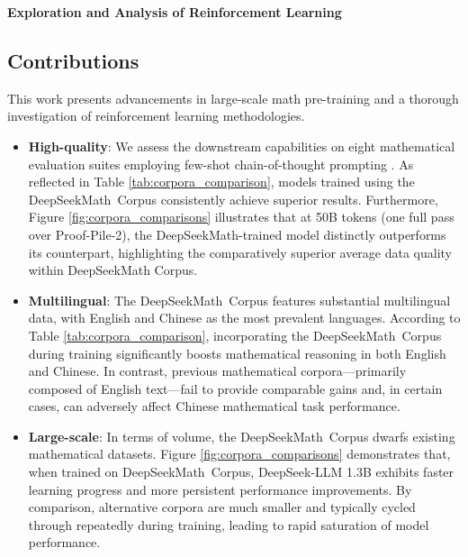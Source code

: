 \textbf{Exploration and Analysis of Reinforcement Learning}

\subsection{Contributions}
This work presents advancements in large-scale math pre-training and a thorough investigation of reinforcement learning methodologies.

\begin{itemize}[topsep=0pt]
    \item \textbf{High-quality}:
    We assess the downstream capabilities on eight mathematical evaluation suites employing few-shot chain-of-thought prompting \cite{cot}. As reflected in Table \ref{tab:corpora_comparison}, models trained using the DeepSeekMath~Corpus consistently achieve superior results. Furthermore, Figure \ref{fig:corpora_comparisons} illustrates that at 50B tokens (one full pass over Proof-Pile-2), the DeepSeekMath-trained model distinctly outperforms its counterpart, highlighting the comparatively superior average data quality within DeepSeekMath Corpus.
    \item \textbf{Multilingual}:
    The DeepSeekMath~Corpus features substantial multilingual data, with English and Chinese as the most prevalent languages. According to Table \ref{tab:corpora_comparison}, incorporating the DeepSeekMath~Corpus during training significantly boosts mathematical reasoning in both English and Chinese. In contrast, previous mathematical corpora—primarily composed of English text—fail to provide comparable gains and, in certain cases, can adversely affect Chinese mathematical task performance.
    \item \textbf{Large-scale}:
    In terms of volume, the DeepSeekMath~Corpus dwarfs existing mathematical datasets. Figure \ref{fig:corpora_comparisons} demonstrates that, when trained on DeepSeekMath~Corpus, DeepSeek-LLM 1.3B exhibits faster learning progress and more persistent performance improvements. By comparison, alternative corpora are much smaller and typically cycled through repeatedly during training, leading to rapid saturation of model performance.
\end{itemize}

